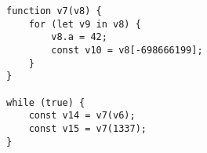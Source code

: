 \begin{figure*}[t]
\begin{center}
\begin{lstlisting}[style=JS,caption=PoC Crash]
function v7(v8) {
    for (let v9 in v8) {
        v8.a = 42;
        const v10 = v8[-698666199];
    }
}

while (true) {
    const v14 = v7(v6);
    const v15 = v7(1337);
}
\end{lstlisting}
\end{center}
\end{figure*}

